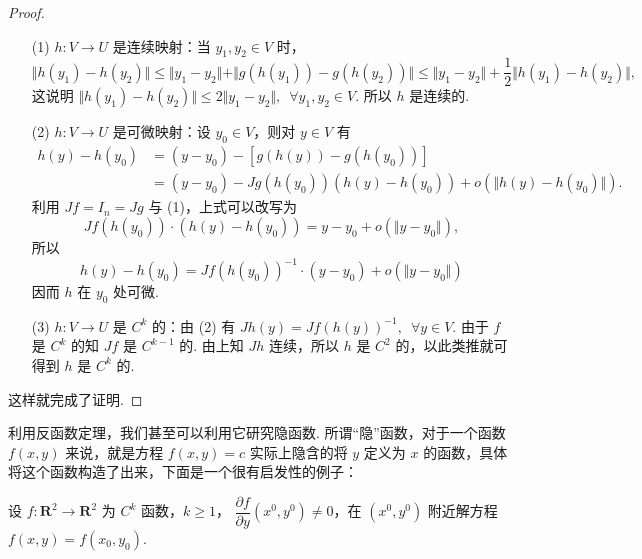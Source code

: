 \begin{proof}
    \begin{enumerate}
        \item[(1)] $h: V\to U$ 是连续映射：当 $y_1,y_2\in V$ 时，\[\Vert h(y_1) - h(y_2)\Vert \leqslant \Vert y_1 - y_2 \Vert +\Vert g(h(y_1)) - g(h(y_2))\Vert \leqslant \Vert y_1 - y_2\Vert + \frac{1}{2}\Vert h(y_1) - h(y_2)\Vert,\]
        这说明 $\Vert h(y_1) - h(y_2)\Vert \leqslant 2\Vert y_1 - y_2\Vert,\enspace \forall y_1, y_2\in V$. 所以 $h$ 是连续的.
        \item[(2)] $h: V\to U$ 是可微映射：设 $y_0\in V$，则对 $y\in V$ 有
            \[\begin{aligned}
                h(y) - h(y_0) &= (y - y_0) - [g(h(y)) - g(h(y_0))]\\
                &= (y - y_0) - Jg(h(y_0))(h(y) - h(y_0)) + o(\Vert h(y) - h(y_0)\Vert).
            \end{aligned}\]
            利用 $Jf = I_n = Jg$ 与 (1)，上式可以改写为\[Jf(h(y_0))\cdot(h(y) - h(y_0)) = y - y_0 + o(\Vert y - y_0\Vert),\]
            所以 \[h(y) - h(y_0) = Jf(h(y_0))^{-1}\cdot(y - y_0) + o(\Vert y - y_0\Vert)\]
            因而 $h$ 在 $y_0$ 处可微.
        \item[(3)] $h: V\to U$ 是 $C^k$ 的：由 (2) 有 $Jh(y) = Jf(h(y))^{-1},\enspace \forall y\in V$. 由于 $f$ 是 $C^k$ 的知 $Jf$ 是 $C^{k-1}$ 的. 由上知 $Jh$ 连续，所以 $h$ 是 $C^2$ 的，以此类推就可得到 $h$ 是 $C^k$ 的.
    \end{enumerate}

    这样就完成了证明.
\end{proof}

利用反函数定理，我们甚至可以利用它研究隐函数. 所谓“隐”函数，对于一个函数 $f(x, y)$ 来说，就是方程 $f(x, y) = c$ 实际上隐含的将 $y$ 定义为 $x$ 的函数，具体将这个函数构造了出来，下面是一个很有启发性的例子：

\begin{example}{}{}{\label{ex:25:隐函数}}
    设 $f:\mathbf{R}^2\to\mathbf{R}^2$ 为 $C^{k}$ 函数，$k\geqslant 1$， $\dfrac{\partial f}{\partial y}(x^0, y^0)\neq 0$，在 $(x^0, y^0)$ 附近解方程 $f(x, y) = f(x_0, y_0)$.
\end{example}

